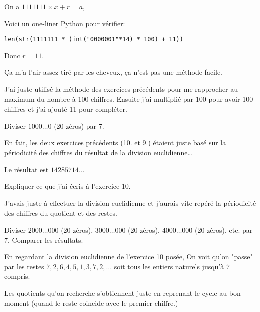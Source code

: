 \documentclass[fleqn,a4paper,nobib]{tufte-handout}
\begin{document}
\begin{solution}
    On a $1111111\times x + r = a$,
    
    Voici un one-liner Python pour vérifier:
    
    \texttt{len(str(1111111 * (int("0000001"*14) * 100) + 11))}

    Donc $r = 11$.

    Ça m'a l'air assez tiré par les cheveux, ça n'est
    pas une méthode facile.

    J'ai juste utilisé la méthode des exercices précédents
    pour me rapprocher au maximum du nombre à 100 chiffres.
    Ensuite j'ai multiplié par 100 pour avoir 100 chiffres
    et j'ai ajouté 11 pour compléter.
\end{solution}







\begin{exercise}
    Diviser $1000\dots0$ (20 zéros) par $7$.
\end{exercise}

\begin{solution}
    En fait, les deux exercices précédents (10. et 9.)
    étaient juste basé sur la périodicité des chiffres
    du résultat de la division euclidienne\dots

    Le résultat est $14285714\dots$
\end{solution}





\begin{exercise}
    Expliquer ce que j'ai écris à l'exercice 10.
\end{exercise}

\begin{solution}
    J'avais juste à effectuer la division euclidienne et j'aurais
    vite repéré la périodicité des chiffres du quotient et des restes.
\end{solution}




\begin{exercise}
    Diviser $2000\dots000$ (20 zéros), $3000\dots000$ (20 zéros),
    $4000\dots000$ (20 zéros), etc. par $7$. Comparer les résultats.
\end{exercise}

\begin{solution}
    En regardant la division euclidienne de l'exercice 10 posée,
    On voit qu'on "passe" par les restes
    $7, 2, 6, 4, 5, 1, 3, 7, 2, \dots$ soit tous les entiers naturels
    jusqu'à $7$ compris.

    Les quotients qu'on recherche s'obtiennent juste en reprenant le cycle
    au bon moment (quand le reste coincide avec le premier chiffre.)
\end{solution}
\end{document}
